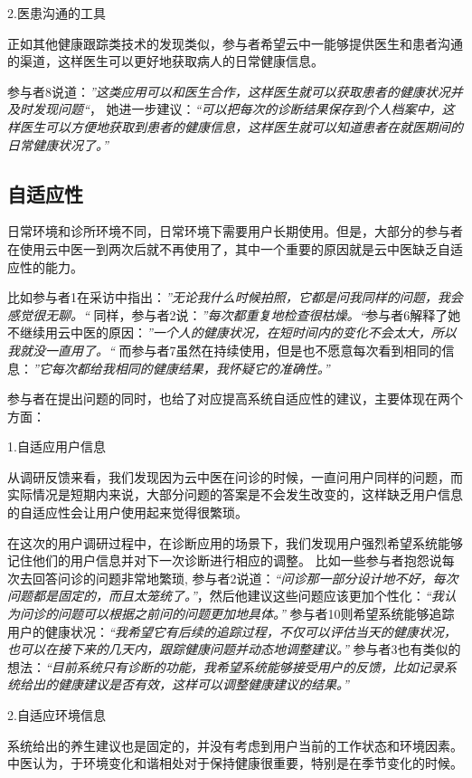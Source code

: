 2.医患沟通的工具

正如其他健康跟踪类技术的发现类似，参与者希望云中一能够提供医生和患者沟通的渠道，这样医生可以更好地获取病人的日常健康信息。

参与者8说道：\textit{”这类应用可以和医生合作，这样医生就可以获取患者的健康状况并及时发现问题“}， 她进一步建议：\textit{“可以把每次的诊断结果保存到个人档案中，这样医生可以方便地获取到患者的健康信息，这样医生就可以知道患者在就医期间的日常健康状况了。”}

\subsection{自适应性}
日常环境和诊所环境不同，日常环境下需要用户长期使用。但是，大部分的参与者在使用云中医一到两次后就不再使用了，其中一个重要的原因就是云中医缺乏自适应性的能力。

比如参与者1在采访中指出：\textit{”无论我什么时候拍照，它都是问我同样的问题，我会感觉很无聊。“}
同样，参与者2说：\textit{”每次都重复地检查很枯燥。“}参与者6解释了她不继续用云中医的原因：\textit{”一个人的健康状况，在短时间内的变化不会太大，所以我就没一直用了。“}
而参与者7虽然在持续使用，但是也不愿意每次看到相同的信息：\textit{”它每次都给我相同的健康结果，我怀疑它的准确性。”}

参与者在提出问题的同时，也给了对应提高系统自适应性的建议，主要体现在两个方面：

1.自适应用户信息

从调研反馈来看，我们发现因为云中医在问诊的时候，一直问用户同样的问题，而实际情况是短期内来说，大部分问题的答案是不会发生改变的，这样缺乏用户信息的自适应性会让用户使用起来觉得很繁琐。

在这次的用户调研过程中，在诊断应用的场景下，我们发现用户强烈希望系统能够记住他们的用户信息并对下一次诊断进行相应的调整。
比如一些参与者抱怨说每次去回答问诊的问题非常地繁琐, 参与者2说道：\textit{“问诊那一部分设计地不好，每次问题都是固定的，而且太笼统了。”}，然后他建议这些问题应该更加个性化：\textit{“我认为问诊的问题可以根据之前问的问题更加地具体。”}
参与者10则希望系统能够追踪用户的健康状况：\textit{“我希望它有后续的追踪过程，不仅可以评估当天的健康状况，也可以在接下来的几天内，跟踪健康问题并动态地调整建议。”}
参与者3也有类似的想法：\textit{“目前系统只有诊断的功能，我希望系统能够接受用户的反馈，比如记录系统给出的健康建议是否有效，这样可以调整健康建议的结果。”}

2.自适应环境信息

系统给出的养生建议也是固定的，并没有考虑到用户当前的工作状态和环境因素。中医认为，于环境变化和谐相处对于保持健康很重要，特别是在季节变化的时候。

